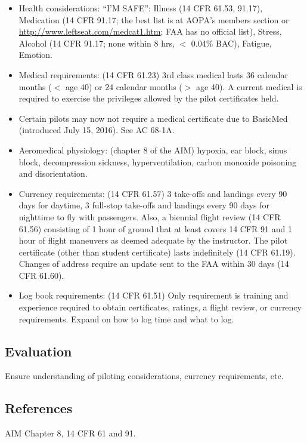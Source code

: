 \begin{itemize}
  \item Health considerations: ``I'M SAFE'': Illness (14 CFR 61.53, 91.17),
    Medication (14 CFR 91.17; the best list is at AOPA's members section or
    \url{http://www.leftseat.com/medcat1.htm}; FAA has no official list),
    Stress, Alcohol (14 CFR 91.17; none within 8 hrs, $<$ 0.04\% BAC), Fatigue,
    Emotion.

  \item Medical requirements: (14 CFR 61.23) 3rd class medical lasts 36
    calendar months ($<$ age 40) or 24 calendar months ($>$ age 40). A current
    medical is required to exercise the privileges allowed by the pilot
    certificates held.

  \item Certain pilots may now not require a medical certificate due to
    BasicMed (introduced July 15, 2016). See AC 68-1A.

  \item Aeromedical physiology: (chapter 8 of the AIM) hypoxia, ear block,
    sinus block, decompression sickness, hyperventilation, carbon monoxide
    poisoning and disorientation.

  \item Currency requirements: (14 CFR 61.57) 3 take-offs and landings every 90
    days for daytime, 3 full-stop take-offs and landings every 90 days for
    nighttime to fly with passengers. Also, a biennial flight review (14 CFR
    61.56) consisting of 1 hour of ground that at least covers 14 CFR 91 and 1
    hour of flight maneuvers as deemed adequate by the instructor. The pilot
    certificate (other than student certificate) lasts indefinitely (14 CFR
    61.19). Changes of address require an update sent to the FAA within 30 days
    (14 CFR 61.60).

  \item Log book requirements: (14 CFR 61.51) Only requirement is training and
    experience required to obtain certificates, ratings, a flight review, or
    currency requirements. Expand on how to log time and what to log.

\end{itemize}

\subsection{Evaluation}

Ensure understanding of piloting considerations, currency requirements, etc.

\subsection{References}

AIM Chapter 8, 14 CFR 61 and 91.

